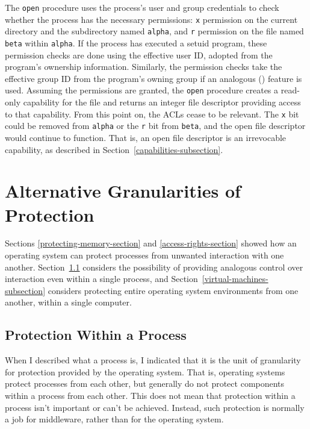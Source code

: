 The \verb|open| procedure uses the process's user and group
credentials to check whether the process has the necessary
permissions: \verb|x| permission on the current directory and the
subdirectory named \verb|alpha|, and \verb|r| permission on the file
named \verb|beta| within \verb|alpha|.  If the process has executed a setuid
program, these permission checks are done using the
effective user ID, adopted from the program's ownership
information.  Similarly, the permission checks take the effective
group ID from the program's owning group
if an analogous  ()
feature is used.  Assuming the permissions are granted, the \verb|open|
procedure creates a read-only capability for the file and returns an
integer file descriptor providing access to that capability.  From
this point on, the ACLs cease to be relevant.  The \verb|x| bit could
be removed from \verb|alpha| or the \verb|r| bit from \verb|beta|, and
the open file descriptor would continue to function.  That is, an open
file descriptor is an irrevocable capability, as described in
Section~\ref{capabilities-subsection}.

\section{Alternative Granularities of Protection}\label{protection-granularities-section}

Sections \ref{protecting-memory-section} and
\ref{access-rights-section} showed how an operating system can protect
processes from unwanted interaction with one another.
Section~\ref{protection-within-a-process} considers the
possibility of providing analogous control over interaction even
within a single process, and
Section~\ref{virtual-machines-subsection} considers protecting entire
operating system environments from one another, within a single
computer.

\subsection{Protection Within a Process}
\label{protection-within-a-process}

When I described what a process is, I indicated that it is the unit
of granularity for protection provided by the operating system.  That
is, operating systems protect processes from each other, but generally
do not protect components within a process from each other.  This does
not mean that protection within a process isn't important or can't be
achieved. Instead, such protection is normally a job for middleware, rather
than for the operating system.


